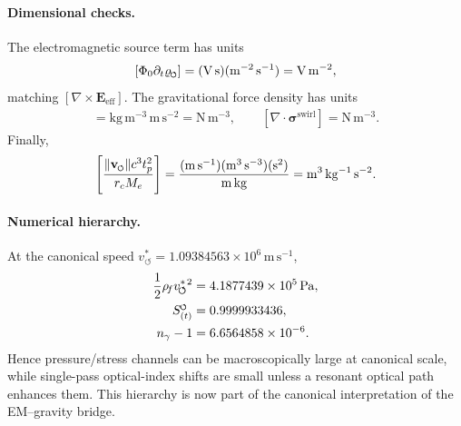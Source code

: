 \documentclass[11pt]{article}
\theoremstyle{definition}
\theoremstyle{plain}
\theoremstyle{remark}
\newcommand{\swirlarrow}{\mathchoice{\mkern-2mu\scriptstyle\boldsymbol{\circlearrowleft}}{\mkern-2mu\scriptstyle\boldsymbol{\circlearrowleft}}{\mkern-2mu\scriptscriptstyle\boldsymbol{\circlearrowleft}}{\mkern-2mu\scriptscriptstyle\boldsymbol{\circlearrowleft}}}
\newcommand{\vswirl}{\mathbf{v}_{\swirlarrow}}
\newcommand{\rhoF}{{\rho_{\!f}}}
\newcommand{\rhoM}{\rho_{\!m}}
\newcommand{\SwirlClock}{{S_{(t)}^{\swirlarrow}}}
\newcommand{\rc}{{r_c}}
\newcommand{\vchar}{v_{\!\boldsymbol{\circlearrowleft}}^{\ast}}
\begin{document}
        \paragraph{Dimensional checks.}
        The electromagnetic source term has units
        \begin{align}
            \left[\Phi_0\partial_t\varrho_{\swirlarrow}\right]
            =
            (\mathrm{V\,s})(\mathrm{m^{-2}\,s^{-1}})
            =
            \mathrm{V\,m^{-2}},
        \end{align}
        matching \([\nabla\times\mathbf{E}_{\mathrm{eff}}]\). The gravitational force density has units
        \begin{align}
            [\rhoM\mathbf{g}_{\swirlarrow}]
            =
            \mathrm{kg\,m^{-3}}\,\mathrm{m\,s^{-2}}
            =
            \mathrm{N\,m^{-3}},
            \qquad
            [\nabla\cdot\boldsymbol{\sigma}^{\mathrm{swirl}}]
            =
            \mathrm{N\,m^{-3}}.
        \end{align}
        Finally,
        \begin{align}
            \left[
            \frac{\lVert\vswirl\rVert c^3 t_p^2}{\rc M_e}
            \right]
            =
            \frac{(\mathrm{m\,s^{-1}})(\mathrm{m^3\,s^{-3}})(\mathrm{s^2})}
            {\mathrm{m}\,\mathrm{kg}}
            =
            \mathrm{m^3\,kg^{-1}\,s^{-2}}.
        \end{align}

        \paragraph{Numerical hierarchy.}
        At the canonical speed \(\vchar=1.09384563\times10^6\,\mathrm{m\,s^{-1}}\),
        \begin{align}
            \frac{1}{2}\rhoF\vchar{}^2
            &=
            4.1877439\times10^5\,\mathrm{Pa},
            \\
            \SwirlClock
            &=
            0.9999933436,
            \\
            n_\gamma-1
            &=
            6.6564858\times10^{-6}.
            \label{eq:canonical_emg_numerical_hierarchy}
        \end{align}
        Hence pressure/stress channels can be macroscopically large at canonical scale, while single-pass optical-index shifts are small unless a resonant optical path enhances them. This hierarchy is now part of the canonical interpretation of the EM--gravity bridge.
\end{document}
